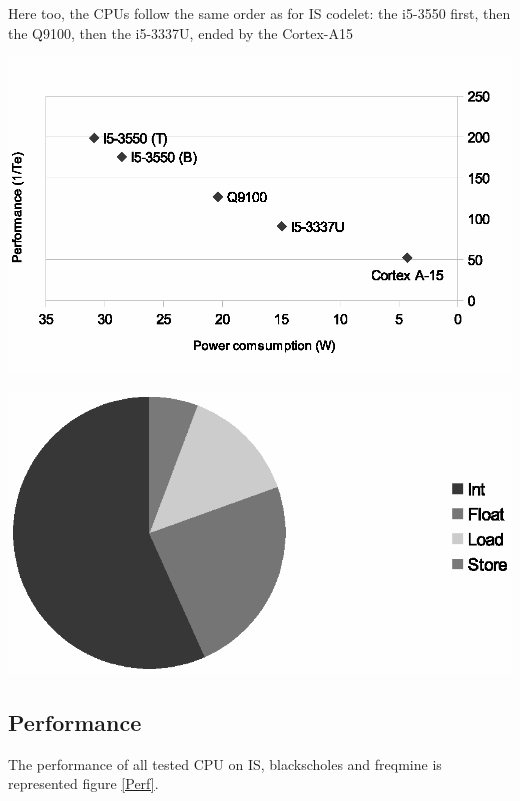 \documentclass{article}
\newenvironment{Figure}
  {\par\medskip\noindent\center\minipage{0.9\linewidth}}
  {\endminipage\par\bigskip\medskip}
\begin{document}
\begin{multicols}{2}
Here too, the CPUs follow the same order as for IS codelet: the i5-3550 first, then the Q9100, then the i5-3337U, ended by the Cortex-A15


\begin{Figure}
\centering
\includegraphics[width=\linewidth]{Blackscholes.eps}
\end{Figure}

\begin{Figure}
\centering
\includegraphics[width=\linewidth]{Blackscholes_instr.eps}
\end{Figure}

\subsection{Performance}
The performance of all tested CPU on IS, blackscholes and freqmine is represented figure \ref{Perf}.


\end{multicols}
\end{document}
